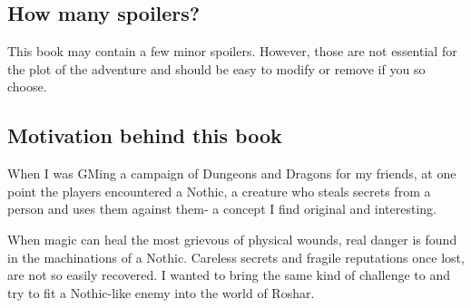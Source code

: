 \subsection{How many spoilers?}

This book may contain a few minor \bookED{} spoilers. However, those are not essential for the plot of the adventure and should be easy to modify or remove if you so choose.

\subsection{Motivation behind this book}

When I was GMing a campaign of Dungeons and Dragons for my friends, at one point the players encountered a Nothic, a creature who steals secrets from a person and uses them against them- a concept I find original and interesting.

When magic can heal the most grievous of physical wounds, real danger is found in the machinations of a Nothic. Careless secrets and fragile reputations once lost, are not so easily recovered. I wanted to bring the same kind of challenge to \cosmereRPG{} and try to fit a Nothic-like enemy into the world of Roshar.